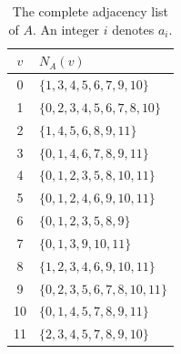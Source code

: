 \begin{table}[H]
\centering\small\setlength{\tabcolsep}{4pt}
\caption{The complete adjacency list of \(A\). An integer \(i\) denotes \(a_i\).}\label{6k6:tab:Aadj}
\begin{tabular}{c l}
\toprule
$v$ & $N_A(v)$\\
\midrule

0 & \(\{1,3,4,5,6,7,9,10\}\)\\
1 & \(\{0,2,3,4,5,6,7,8,10\}\)\\
2 & \(\{1,4,5,6,8,9,11\}\)\\
3 & \(\{0,1,4,6,7,8,9,11\}\)\\
4 & \(\{0,1,2,3,5,8,10,11\}\)\\
5 & \(\{0,1,2,4,6,9,10,11\}\)\\
6 & \(\{0,1,2,3,5,8,9\}\)\\
7 & \(\{0,1,3,9,10,11\}\)\\
8 & \(\{1,2,3,4,6,9,10,11\}\)\\
9 & \(\{0,2,3,5,6,7,8,10,11\}\)\\
10 & \(\{0,1,4,5,7,8,9,11\}\)\\
11 & \(\{2,3,4,5,7,8,9,10\}\)\\
\bottomrule
\end{tabular}
\end{table}
